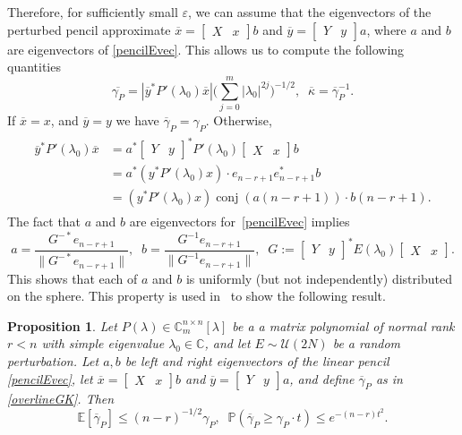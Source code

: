 \documentclass[12pt]{article}
\newtheorem{proposition}[theorem]{Proposition}
\begin{document}
Therefore, for sufficiently small $\varepsilon$, we can assume that the eigenvectors of the perturbed pencil approximate $\overline{x} = \begin{bmatrix}
    X & x
    \end{bmatrix}b$ and $\overline{y} = \begin{bmatrix}
    Y & y
    \end{bmatrix}a$, where $a$ and $b$ are eigenvectors of \eqref{pencilEvec}. This allows us to compute the following quantities
\begin{equation}\label{overlineGK}
    \overline{\gamma_P} = |\overline{y}^*P'(\lambda_0)\overline{x} | \Big( \sum^m_{j=0}|\lambda_0|^{2j} \Big)^{-1/2}, \;\; \overline{\kappa} = \overline{\gamma}_P^{-1}.
\end{equation}
If $\overline{x}=x$, and $\overline{y} = y$ we have $\overline{\gamma}_P = \gamma_P$. Otherwise,
\begin{align}\label{LambdaPCon}
\begin{split}
    \overline{y}^*P'(\lambda_0)\overline{x} &= a^*\begin{bmatrix}
        Y & y
    \end{bmatrix}^*P'(\lambda_0)\begin{bmatrix}
        X & x
    \end{bmatrix}b\\
    &= a^*(y^*P'(\lambda_0)x)\cdot e_{n-r+1}e^*_{n-r+1}b\\
    &= (y^*P'(\lambda_0)x)\operatorname{conj}( a(n-r+1))\cdot b(n-r+1).
\end{split}
\end{align}
The fact that $a$ and $b$ are eigenvectors for~\eqref{pencilEvec} implies
\[
    a = \frac{G^{-*}e_{n-r+1}}{\|G^{-*}e_{n-r+1}\|},\;\; b=\frac{G^{-1}e_{n-r+1}}{\|G^{-1}e_{n-r+1}\|}, \;\; G :=\begin{bmatrix}
    Y & y
    \end{bmatrix}^*E(\lambda_0)\begin{bmatrix}
    X & x
    \end{bmatrix}.
\]
This shows that each of $a$ and $b$ is uniformly (but not independently) distributed on the sphere. This property is used in~\cite[Proposition 6.5]{lotz2020wilkinson} to show the following result.
\begin{proposition} \label{p:gammaP}
    Let $P(\lambda)\in\mathbb{C}^{n\times n}_m[\lambda]$ be a a matrix polynomial of normal rank $r<n$ with simple eigenvalue $\lambda_0\in\mathbb{C}$, and let $E \sim \mathcal{U}(2N)$ be a random perturbation. Let $a,b$ be left and right eigenvectors of the linear pencil \eqref{pencilEvec}, let $\overline{x} = \begin{bmatrix}
    X & x
    \end{bmatrix}b$ and $\overline{y} = \begin{bmatrix}
    Y & y
    \end{bmatrix}a$, and define $\overline{\gamma}_P$ as in \eqref{overlineGK}. Then
\[
        \mathbb{E}[\overline{\gamma}_P]\leq (n-r)^{-1/2}\gamma_P, \;\; \mathbb{P}(\overline{\gamma}_P\geq \gamma_P\cdot t)\leq e^{-(n-r)t^2}.
\]
\end{proposition}
\end{document}
